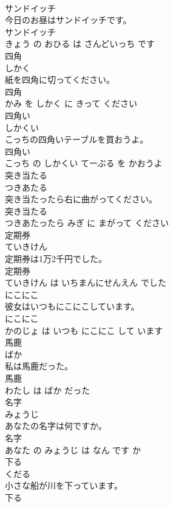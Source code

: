 \documentclass[8pt]{extreport}
\begin{document}
\begin{CJK}{UTF8}{min}
\\	サンドイッチ	
\\	今日のお昼はサンドイッチです。	
\\	サンドイッチ 
\\	きょう の おひる は さんどいっち です			
\\	四角	
\\	しかく			
\\	紙を四角に切ってください。	
\\	四角 
\\	かみ を しかく に きって ください			
\\	四角い	
\\	しかくい			
\\	こっちの四角いテーブルを買おうよ。	
\\	四角い 
\\	こっち の しかくい てーぶる を かおうよ			
\\	突き当たる	
\\	つきあたる			
\\	突き当たったら右に曲がってください。	
\\	突き当たる 
\\	つきあたったら みぎ に まがって ください			
\\	定期券	
\\	ていきけん			
\\	定期券は1万2千円でした。	
\\	定期券 
\\	ていきけん は いちまんにせんえん でした			
\\	にこにこ	
\\	彼女はいつもにこにこしています。	
\\	にこにこ 
\\	かのじょ は いつも にこにこ して います			
\\	馬鹿	
\\	ばか			
\\	私は馬鹿だった。	
\\	馬鹿 
\\	わたし は ばか だった			
\\	名字	
\\	みょうじ			
\\	あなたの名字は何ですか。	
\\	名字 
\\	あなた の みょうじ は なん です か			
\\	下る	
\\	くだる			
\\	小さな船が川を下っています。	
\\	下る 

\end{CJK}
\end{document}
